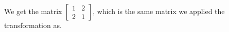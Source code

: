\documentclass[preview]{standalone}
\begin{document}
\begin{minipage}
{8cm}We get the matrix $\begin{bmatrix}1 & 2\\ 2 & 1\end{bmatrix}$, which is the same matrix we applied the transformation as.
\end{minipage}
\end{document}
